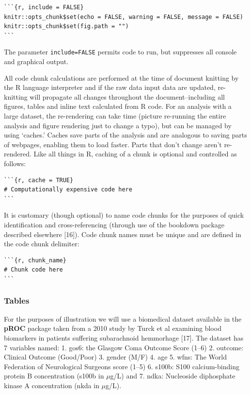 \documentclass[]{elsarticle} %
\begin{document}
\begin{verbatim}
```{r, include = FALSE}
knitr::opts_chunk$set(echo = FALSE, warning = FALSE, message = FALSE)
knitr::opts_chunk$set(fig.path = "")
```
\end{verbatim}

\noindent The parameter \texttt{include=FALSE} permits code to run, but
suppresses all console and graphical output.

All code chunk calculations are performed at the time of document
knitting by the R language interpreter and if the raw data input data
are updated, re-knitting will propagate all changes throughout the
document--including all figures, tables and inline text calculated from
R code. For an analysis with a large dataset, the re-rendering can take
time (picture re-running the entire analysis and figure rendering just
to change a typo), but can be managed by using `caches.' Caches save
parts of the analysis and are analogous to saving parts of webpages,
enabling them to load faster. Parts that don't change aren't
re-rendered. Like all things in R, caching of a chunk is optional and
controlled as follows:

\begin{verbatim}
```{r, cache = TRUE} 
# Computationally expensive code here
```
\end{verbatim}

It is customary (though optional) to name code chunks for the purposes
of quick identification and cross-referencing (through use of the
bookdown package described elsewhere {[}16{]}). Code chunk names must be
unique and are defined in the code chunk delimiter:

\begin{verbatim}
```{r, chunk_name} 
# Chunk code here
```
\end{verbatim}

\hypertarget{tables}{%
\subsubsection{Tables}\label{tables}}

For the purposes of illustration we will use a biomedical dataset
available in the \textbf{pROC} package taken from a 2010 study by Turck
et al examining blood biomarkers in patients suffering subarachnoid
hemmorhage {[}17{]}. The dataset has 7 variables named: 1. gos6: the
Glasgow Coma Outcome Score (1--6) 2. outcome: Clinical Outcome
(Good/Poor) 3. gender (M/F) 4. age 5. wfns: The World Federation of
Neurological Surgeons score (1--5) 6. s100b: S100 calcium-binding
protein B concentration (s100b in \(\mu\)g/L) and 7. ndka: Nucleoside
diphosphate kinase A concentration (nkda in \(\mu\)g/L).
\end{document}
